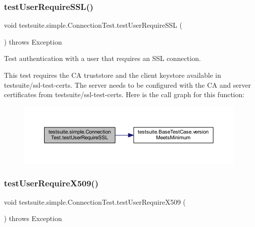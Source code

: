 \subsubsection{\texorpdfstring{test\+User\+Require\+S\+S\+L()}{testUserRequireSSL()}}
{\footnotesize\ttfamily void testsuite.\+simple.\+Connection\+Test.\+test\+User\+Require\+S\+SL (\begin{DoxyParamCaption}{ }\end{DoxyParamCaption}) throws Exception}

Test authentication with a user that requires an S\+SL connection.

This test requires the CA truststore and the client keystore available in testsuite/ssl-\/test-\/certs. The server needs to be configured with the CA and server certificates from testsuite/ssl-\/test-\/certs. Here is the call graph for this function\+:
\nopagebreak
\begin{figure}[H]
\begin{center}
\leavevmode
\includegraphics[width=350pt]{classtestsuite_1_1simple_1_1_connection_test_a0c148553019aa296f7f80dfc7edf1e49_cgraph}
\end{center}
\end{figure}
\mbox{\label{classtestsuite_1_1simple_1_1_connection_test_a8ccc3af85ebbc2d7b461b32b29d8982c}} 
\subsubsection{\texorpdfstring{test\+User\+Require\+X509()}{testUserRequireX509()}}
{\footnotesize\ttfamily void testsuite.\+simple.\+Connection\+Test.\+test\+User\+Require\+X509 (\begin{DoxyParamCaption}{ }\end{DoxyParamCaption}) throws Exception}

